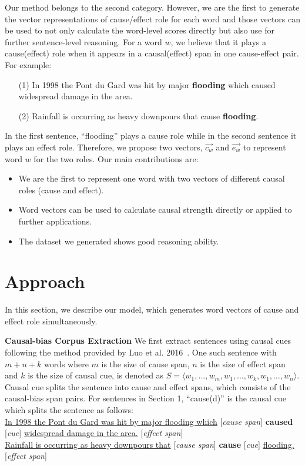\documentclass[conference]{IEEEtran}
\begin{document}
Our method belongs to the second category. However, we are the first to generate the vector representations of cause/effect role for each word and those vectors can be used to not only calculate the word-level scores directly but also use for further sentence-level reasoning. For a word $w$, we believe that it plays a cause(effect) role when it appears in a causal(effect) span in one cause-effect pair. 
For example:
\begin{itemize}
	\item[(1)] In 1998 the Pont du Gard was hit by major \textbf{flooding} which caused widespread damage in the area.
	\item[(2)] Rainfall is occurring as heavy downpours that cause \textbf{flooding}.
\end{itemize}
In the first sentence, ``flooding'' plays a cause role while in the second sentence it plays an effect role. Therefore, we propose two vectors, $\overrightarrow{c_w}$ and $\overrightarrow{e_w}$ to represent word $w$ for the two roles.
Our main contributions are:
\begin{itemize}
	\item We are the first to represent one word with two vectors of different causal roles (cause and effect).
	\item Word vectors can be used to calculate causal strength directly or applied to further applications.
	\item The dataset we generated shows good reasoning ability.
\end{itemize}

\section{Approach}
In this section, we describe our model, which generates word vectors of cause and effect role simultaneously. 

\textbf{Causal-bias Corpus Extraction} We first extract sentences using causal cues following the method provided by Luo et al. 2016~\cite{kr2016}.  One such sentence with $m+n+k$ words where $m$ is the size of cause span, $n$ is the size of effect span and $k$ is the size of causal cue, is denoted as $S = \langle w_1, ..., w_m, w_1, \dots, w_k, w_1, \dots, w_n\rangle$. Causal cue splits the sentence into cause and effect spans, which consists of the causal-bias span pairs. For sentences in Section 1, ``cause(d)'' is the causal cue which splits the sentence as follows:\\
 \underline{In 1998 the Pont du Gard was hit by major flooding which} [\emph{cause span}] {\bf caused} [\emph{cue}] \underline{widespread damage in the area.} [\emph{effect span}]\\
\underline{Rainfall is occurring as heavy downpours that} [\emph{cause span}] {\bf cause} [\emph{cue}] \underline{flooding.} [\emph{effect span}]
\end{document}
